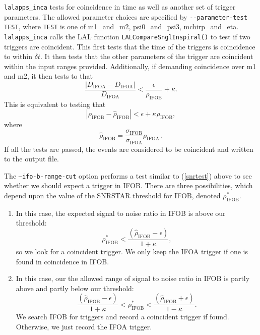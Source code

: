 \begin{entry}
\texttt{lalapps\_inca} tests for coincidence in time as well as another set of
trigger parameters.  The allowed parameter choices are specified by
\verb$--parameter-test$ \texttt{TEST}, where \texttt{TEST} is one of
m1\_and\_m2, psi0\_and\_psi3, mchirp\_and\_eta.  \texttt{lalapps\_inca} calls
the LAL function \texttt{LALCompareSnglInspiral()} to test if two triggers are
coincident. This first tests that the time of the triggers is coincidence to
within $\delta t$.  It then tests that the other parameters of the trigger are
coincident within the input ranges provided.  Additionally, if demanding
coincidence over m1 and m2, it then tests to that 
%
\begin{equation} 
  \frac{\left|D_\mathrm{IFOA} - D_\mathrm{IFOA}\right|}{D_\mathrm{IFOA}} < 
  \frac{\epsilon}{\rho_\mathrm{IFOB}} + \kappa.  
\end{equation}
% 
This is equivalent to testing that 
%
\begin{equation}\label{snrtest} 
  \left|\rho_\mathrm{IFOB} - \hat{\rho}_\mathrm{IFOB}\right| < 
  \epsilon + \kappa\rho_\mathrm{IFOB},
\end{equation} 
%
where 
%
\begin{equation} 
  \hat{\rho}_\mathrm{IFOB} = \frac{\sigma_\mathrm{IFOB}}
  {\sigma_\mathrm{IFOA}} \rho_\mathrm{IFOA} \, .  
\end{equation} 
%
If all the tests are passed, the events are considered to be coincident and
written to the output file.

The \texttt{--ifo-b-range-cut} option performs a test similar to
(\ref{snrtest}) above to see whether we should expect a trigger in
\textsc{IFOB}.  There are three possibilities, which depend upon the value of
the \textsc{SNRSTAR} threshold for \textsc{IFOB}, denoted
$\rho_\mathrm{IFOB}^{*}$.

\begin{enumerate}

\item In this case, the expected signal to noise ratio in \textsc{IFOB} is
above our threshold:
%
\begin{equation} 
  \rho_\mathrm{IFOB}^{*} < \frac{(\hat{\rho}_\mathrm{IFOB} - \epsilon)}
  {1 + \kappa} , 
\end{equation}
%
so we look for a coincident trigger.  We only keep the 
\textsc{IFOA} trigger if one is found in coincidence in \textsc{IFOB}.

\item In this case, our the allowed range of signal to noise ratio in 
\textsc{IFOB} is partly above and partly below our threshold: 
%
\begin{equation}
  \frac{(\hat{\rho}_\mathrm{IFOB} - \epsilon)} {1 + \kappa} < 
  \rho_\mathrm{IFOB}^{*} <
  \frac{(\hat{\rho}_\mathrm{IFOB} + \epsilon)} {1 - \kappa} .
\end{equation}
%
We search \textsc{IFOB} for triggers and record a coincident trigger if found.
Otherwise, we just record the \textsc{IFOA} trigger.


\end{enumerate}
\end{entry}
